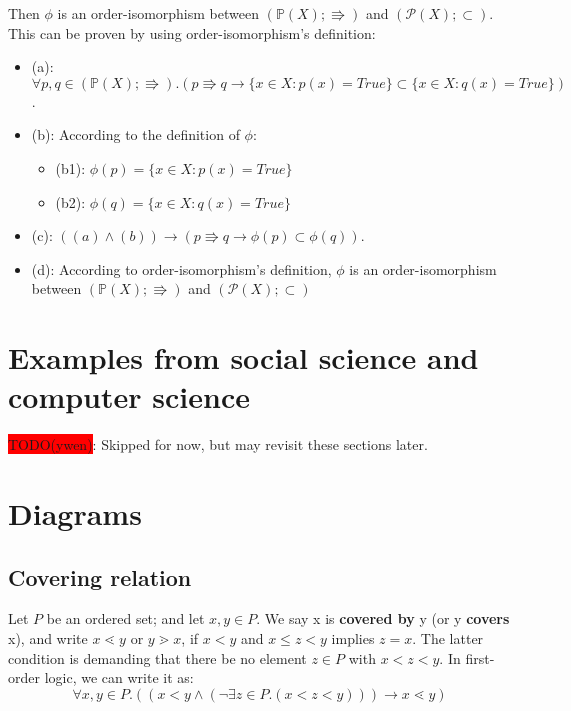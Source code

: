 \documentclass[12pt, letterpaper, oneside]{book}
\begin{document}
Then $\phi$ is an order-isomorphism between $(\mathbb{P}(X); \Rrightarrow)$ and $(\mathcal{P}(X); \subset)$. This can
be proven by using order-isomorphism's definition:
\begin{itemize}
  \item (a): $\forall p, q \in (\mathbb{P}(X); \Rrightarrow). (p \Rrightarrow q \rightarrow \{x \in X: p(x) = True\}
          \subset \{x \in X: q(x) = True\})$.
  \item (b): According to the definition of $\phi$:
        \begin{itemize}
          \item (b1): $\phi(p) = \{x \in X: p(x) = True\}$
          \item (b2): $\phi(q) = \{x \in X: q(x) = True\}$
        \end{itemize}
  \item (c): $((a) \land (b)) \rightarrow (p \Rrightarrow q \rightarrow \phi(p) \subset \phi(q))$.
  \item (d): According to order-isomorphism's definition, $\phi$ is an order-isomorphism between $(\mathbb{P}(X);
          \Rrightarrow)$ and $(\mathcal{P}(X); \subset)$
\end{itemize}

\section{Examples from social science and computer science}

\colorbox{red}{TODO(ywen)}: Skipped for now, but may revisit these sections later.

\section{Diagrams}

\subsection{Covering relation}

Let $P$ be an ordered set; and let $x, y \in P$. We say x is \textbf{covered by} y (or y \textbf{covers} x), and write
$x \lessdot y$ or $y \gtrdot x$, if $x < y$ and $x \leqslant z < y$ implies $z = x$. The latter condition is demanding
that there be no element $z \in P$ with $x < z < y$. In first-order logic, we can write it as:
\[
  \forall x, y \in P. ((x < y \land (\lnot \exists z \in P. (x < z < y))) \rightarrow x \lessdot y)
\]
\end{document}
